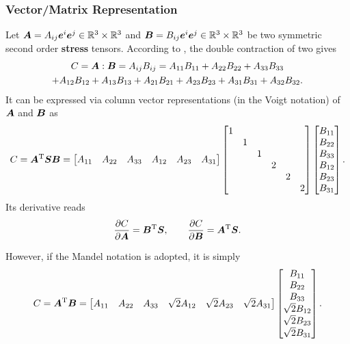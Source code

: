 \subsubsection{Vector/Matrix Representation}
Let $\bm{A}=A_{ij}\bm{e}^i\bm{e}^j\in\mathbb{R}^3\times\mathbb{R}^3$ and $\bm{B}=B_{ij}\bm{e}^i\bm{e}^j\in\mathbb{R}^3\times\mathbb{R}^3$ be two symmetric second order \textbf{stress} tensors. According to , the double contraction of two gives
\begin{multline}
C=\bm{A}:\bm{B}=A_{ij}B_{ij}=A_{11}B_{11}+A_{22}B_{22}+A_{33}B_{33}\\+A_{12}B_{12}+A_{13}B_{13}+A_{21}B_{21}+A_{23}B_{23}+A_{31}B_{31}+A_{32}B_{32}.
\end{multline}
It can be expressed via column vector representations (in the Voigt notation) of $\bm{A}$ and $\bm{B}$ as
\begin{gather}
C=\bm{A}^{\mathrm{T}}\bm{S}\bm{B}=\begin{bmatrix}
A_{11}&A_{22}&A_{33}&A_{12}&A_{23}&A_{31}
\end{bmatrix}
\begin{bmatrix}
1&&&&&\\
&1&&&&\\
&&1&&&\\
&&&2&&\\
&&&&2&\\
&&&&&2
\end{bmatrix}
\begin{bmatrix}
B_{11}\\B_{22}\\B_{33}\\B_{12}\\B_{23}\\B_{31}
\end{bmatrix}.
\end{gather}
Its derivative reads
\begin{gather}
\dfrac{\partial{C}}{\partial{\bm{A}}}=\bm{B}^{\mathrm{T}}\bm{S},\qquad
\dfrac{\partial{C}}{\partial{\bm{B}}}=\bm{A}^{\mathrm{T}}\bm{S}.
\end{gather}

However, if the Mandel notation is adopted, it is simply
\begin{gather}
C=\bm{A}^{\mathrm{T}}\bm{B}=\begin{bmatrix}
A_{11}&A_{22}&A_{33}&\sqrt{2}A_{12}&\sqrt{2}A_{23}&\sqrt{2}A_{31}
\end{bmatrix}
\begin{bmatrix}
B_{11}\\B_{22}\\B_{33}\\\sqrt{2}B_{12}\\\sqrt{2}B_{23}\\\sqrt{2}B_{31}
\end{bmatrix}.
\end{gather}

